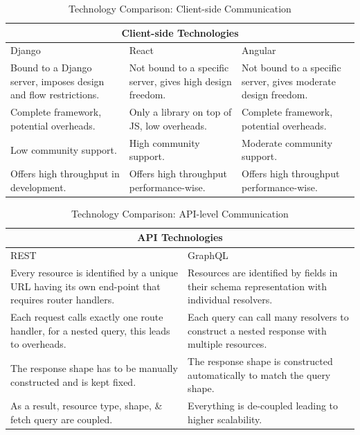 \begin{table}
\begin{tabular}{ @{}|p{5cm}||p{5cm}||p{5cm}|  }
 \hline
 \multicolumn{3}{|c|}{\textbf{Client-side Technologies}} \\
 \hline
 Django & React & Angular \\
 \hline
 Bound to a Django server, imposes design and flow restrictions.  & Not bound to a specific server, gives high design freedom.  & Not bound to a specific server, gives moderate design freedom.\\
 Complete framework, potential overheads. & Only a library on top of JS, low overheads.  & Complete framework, potential overheads.\\
 Low community support. &  High community support. & Moderate community support. \\
 Offers high throughput in development. & Offers high throughput performance-wise. & Offers high throughput performance-wise.\\
 \hline
\end{tabular}
\caption{Technology Comparison: Client-side Communication}
\label{table:tech-client}
\end{table}
\begin{table}
\begin{tabular}{ @{}|p{7cm}||p{7cm}|  }
 \hline
 \multicolumn{2}{|c|}{\textbf{API Technologies}} \\
 \hline
 REST & GraphQL \\
 \hline
 Every resource is identified by a unique URL having its own end-point that requires router handlers.  & Resources are identified by fields in their schema representation with individual resolvers.\\
 Each request calls exactly one route handler, for a nested query, this leads to overheads. & Each query can call many resolvers to construct a nested response with multiple resources. \\
 The response shape has to be manually constructed and is kept fixed. &  The response shape is constructed automatically to match the query shape.  \\
 As a result, resource type, shape, \& fetch query are coupled.  & Everything is de-coupled leading to higher scalability.\\
 \hline
\end{tabular}
\caption{Technology Comparison: API-level Communication}
\label{table:tech-api}
\end{table}

